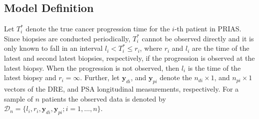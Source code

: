 \subsection{Model Definition}
\label{subsec:model_def}
Let $T_i^*$ denote the true cancer progression time for the $i$-th patient in PRIAS. Since biopsies are conducted periodically, $T_i^*$ cannot be observed directly and it is only known to fall in an interval ${l_i < T_i^* \leq r_i}$, where $r_i$ and $l_i$ are the time of the latest and second latest biopsies, respectively, if the progression is observed at the latest biopsy. When the progression is not observed, then $l_i$ is the time of the latest biopsy and $r_i = \infty$. Further, let $\boldsymbol{y}_{di}$, and $\boldsymbol{y}_{pi}$ denote the $n_{di} \times 1$, and $n_{pi} \times 1$ vectors of the DRE, and PSA longitudinal measurements, respectively. For a sample of $n$ patients the observed data is denoted by ${\mathcal{D}_n = \{l_i, r_i, \boldsymbol{y}_{di}, \boldsymbol{y}_{pi}; i = 1, \ldots, n\}}$.

